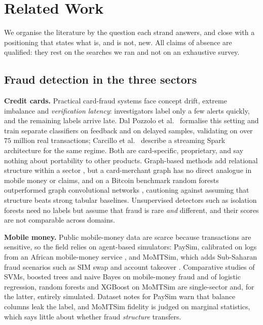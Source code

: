 \documentclass[journal]{IEEEtran}
\newcommand{\1}{\mathbf{1}}
\begin{document}
\section{Related Work}\label{sec:related}
We organise the literature by the question each strand answers, and close with a positioning that states what is, and is not, new. All claims of absence are qualified: they rest on the searches we ran and not on an exhaustive survey.

\subsection{Fraud detection in the three sectors}
\textbf{Credit cards.} Practical card-fraud systems face concept drift, extreme imbalance and \emph{verification latency}: investigators label only a few alerts quickly, and the remaining labels arrive late. Dal Pozzolo et al.\ \cite{dalpozzolo2018realistic} formalise this setting and train separate classifiers on feedback and on delayed samples, validating on over $75$ million real transactions; Carcillo et al.\ \cite{carcillo2018scarff} describe a streaming Spark architecture for the same regime. Both are card-specific, proprietary, and say nothing about portability to other products. Graph-based methods add relational structure within a sector \cite{xiang2023gtan}, but a card-merchant graph has no direct analogue in mobile money or claims, and on a Bitcoin benchmark random forests outperformed graph convolutional networks \cite{weber2019elliptic}, cautioning against assuming that structure beats strong tabular baselines. Unsupervised detectors such as isolation forests \cite{liu2008iforest} need no labels but assume that fraud is rare \emph{and} different, and their scores are not comparable across domains.

\textbf{Mobile money.} Public mobile-money data are scarce because transactions are sensitive, so the field relies on agent-based simulators: PaySim, calibrated on logs from an African mobile-money service \cite{lopezrojas2016paysim}, and MoMTSim, which adds Sub-Saharan fraud scenarios such as SIM swap and account takeover \cite{azamuke2022momtsim,azamuke2025dataset,azamuke2025rich}. Comparative studies of SVMs, boosted trees and naive Bayes on mobile-money fraud \cite{botchey2020mobile} and of logistic regression, random forests and XGBoost on MoMTSim \cite{azamuke2025rich} are single-sector and, for the latter, entirely simulated. Dataset notes for PaySim warn that balance columns leak the label, and MoMTSim fidelity is judged on marginal statistics, which says little about whether fraud \emph{structure} transfers.
\end{document}
